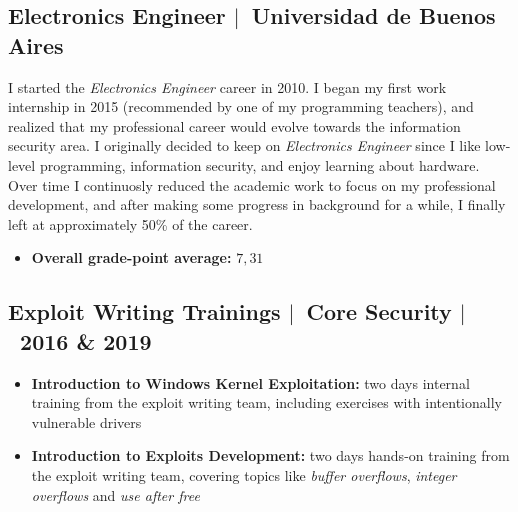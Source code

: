 \documentclass[12pt, a4paper]{article}
\newcommand{\mysep}{{\Large $\mid$}\ }
\newcommand{\titledItem}[2]{\item \textbf{#1:} #2}
\begin{document}
    \subsection*{Electronics Engineer \mysep Universidad de Buenos Aires} \label{subsec:edu1}
    I started the \emph{Electronics Engineer} career in 2010.
    I began my first work internship in 2015 (recommended by one of my programming teachers),
    and realized that my professional career would evolve towards the information security area.
    I originally decided to keep on \emph{Electronics Engineer}
    since I like low-level programming, information security, and enjoy learning about hardware.
    Over time I continuosly reduced the academic work to focus on my professional development,
    and after making some progress in background for a while,
    I finally left at approximately 50\% of the career.
    \begin{itemize}
        \titledItem{Overall grade-point average}{$7,31$}
    \end{itemize}

    \subsection*{Exploit Writing Trainings \mysep Core Security \mysep 2016 \& 2019} \label{subsec:edu2}
    \begin{itemize}
        \titledItem{Introduction to Windows Kernel Exploitation}{%
            two days internal training from the exploit writing team,
            including exercises with intentionally vulnerable drivers
        }
        \titledItem{Introduction to Exploits Development}{%
            two days hands-on training from the exploit writing team,
            covering topics like \emph{buffer overflows}, \emph{integer overflows} and \emph{use after free}
        }
    \end{itemize}
\end{document}
